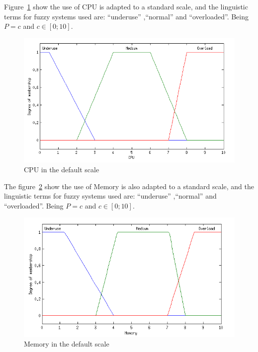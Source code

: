 \documentclass[runningheads,a4paper]{llncs}
\begin{document}
Figure~\ref{fig:CPU} show the use of CPU is adapted to a standard scale, and the linguistic terms for fuzzy systems used are: ``underuse'' ,``normal'' and ``overloaded''. Being $P = c$ and $c \in [0;10]$.
\begin{figure}[H]
    \centering
    \includegraphics[scale=.7]{imagens/cpu.png}
    \caption{CPU in the default scale}
    \label{fig:CPU}
\end{figure}




The figure~\ref{fig:memoria} show the use of Memory is also adapted to a standard scale, and the linguistic terms for fuzzy systems used are: ``underuse'' ,``normal'' and ``overloaded''. Being $P = c$ and $c \in [0;10]$.
\begin{figure}[H]
    \centering
    \includegraphics[scale=.7]{imagens/memoria.png}
    \caption{Memory in the default scale}
    \label{fig:memoria}
\end{figure}
\end{document}
